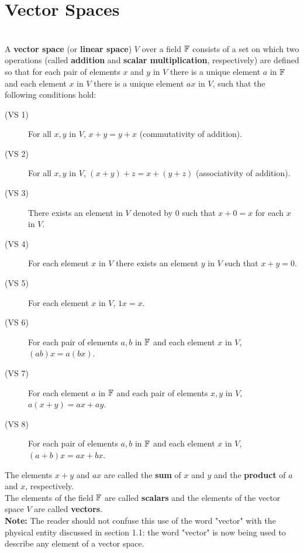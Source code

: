 \section{Vector Spaces}

\begin{definition}
	\hfill\\
	A \textbf{vector space} (or \textbf{linear space}) $V$ over a field $\mathbb{F}$ consists of a set on which two operations (called \textbf{addition} and \textbf{scalar multiplication}, respectively) are defined so that for each pair of elements $x$ and $y$ in $V$ there is a unique element $a$ in $\mathbb{F}$ and each element $x$ in $V$ there is a unique element $ax$ in $V$, such that the following conditions hold:
	
	\begin{description}
		\item[(VS 1)] For all $x, y$ in $V$, $x + y = y + x$ (commutativity of addition).
		\item[(VS 2)] For all $x, y$ in $V$, $(x + y) + z = x + (y + z)$ (associativity of addition).
		\item[(VS 3)] There exists an element in $V$ denoted by $0$ such that $x + 0 = x$ for each $x$ in $V$.
		\item[(VS 4)] For each element $x$ in $V$ there exists an element $y$ in $V$ such that $x + y = 0$.
		\item[(VS 5)] For each element $x$ in $V$, $1x=x$.
		\item[(VS 6)] For each pair of elements $a, b$ in $\mathbb{F}$ and each element $x$ in $V$, $(ab)x = a(bx)$.
		\item[(VS 7)] For each element $a$ in $\mathbb{F}$ and each pair of elements $x, y$ in $V$, $a(x + y) = ax + ay$.
		\item[(VS 8)] For each pair of elements $a, b$ in $\mathbb{F}$ and each element $x$ in $V$, $(a + b)x = ax + bx$.
	\end{description}
	
	The elements $x + y$ and $ax$ are called the \textbf{sum} of $x$ and $y$ and the \textbf{product} of $a$ and $x$, respectively.\\
	
	The elements of the field $\mathbb{F}$ are called \textbf{scalars} and the elements of the vector space $V$ are called \textbf{vectors}.\\
	
	\textbf{Note:} The reader should not confuse this use of the word "vector" with the physical entity discussed in section 1.1: the word "vector" is now being used to describe any element of a vector space.
\end{definition}

